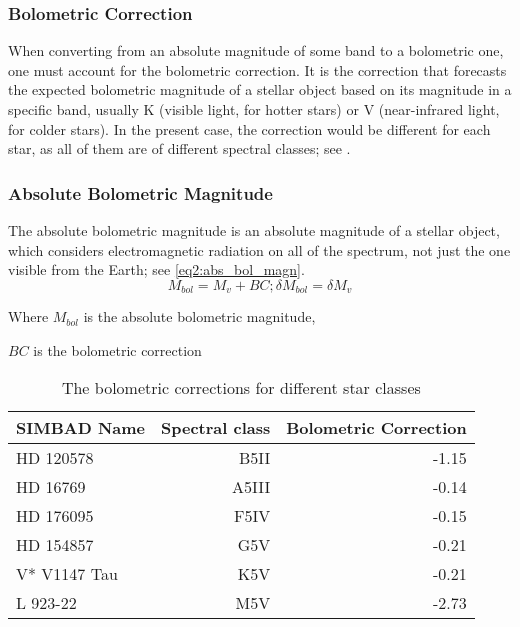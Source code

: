 \documentclass[stu, 11pt, a4paper, floatsintext, noextraspace]{apa7}
\begin{document}
	\subsubsection{Bolometric Correction}
	When converting from an absolute magnitude of some band to a bolometric one, one must account for the bolometric correction. It is the correction that forecasts the expected bolometric magnitude of a stellar object based on its magnitude in a specific band, usually K (visible light, for hotter stars) or V (near-infrared light, for colder stars). In the present case, the correction would be different for each star, as all of them are of different spectral classes; see .
	\subsubsection{Absolute Bolometric Magnitude}
	The absolute bolometric magnitude is an absolute magnitude of a stellar object, which considers electromagnetic radiation on all of the spectrum, not just the one visible from the Earth; see \cref{eq2:abs_bol_magn}.
	\newpage
	\begin{equation}
		\label{eq2:abs_bol_magn}
		M_{bol}=M_v+BC; \delta M_{bol} = \delta M_v
	\end{equation}
	\begin{center}
		Where $M_{bol}$ is the absolute bolometric magnitude,
		
 		$BC$ is the bolometric correction
	\end{center}
	\begin{table}[h!]
		\caption{The bolometric corrections for different star classes}
		\label{tab2:bolometric_corr}
		\begin{tabular}{@{}lrr@{}} \toprule
			SIMBAD Name  & Spectral class & Bolometric Correction \\ \midrule
			HD 120578    & B5II           & -1.15                 \\
			HD 16769     & A5III          & -0.14                 \\
			HD 176095    & F5IV           & -0.15                 \\
			HD 154857    & G5V            & -0.21                 \\
			V* V1147 Tau & K5V            & -0.21                 \\
			L 923-22     & M5V            & -2.73     
		\end{tabular}
	\end{table}
\end{document}
